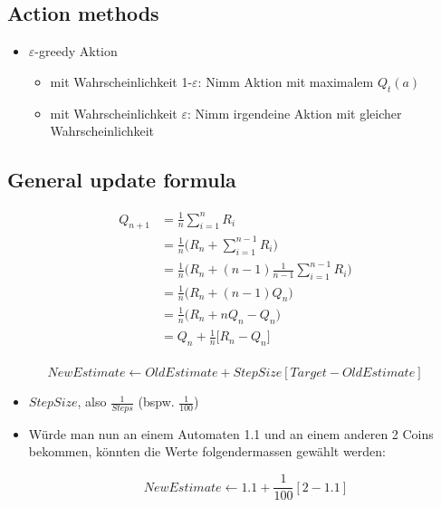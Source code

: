 \documentclass[a4paper]{article}
\begin{document}
		\subsection{Action methods}
		
		\begin{itemize}
			\item $\varepsilon$-greedy Aktion
				\begin{itemize}
					\item mit Wahrscheinlichkeit 1-$\varepsilon$: Nimm Aktion mit maximalem $Q_{t}(a)$
					\item mit Wahrscheinlichkeit $\varepsilon$: Nimm irgendeine Aktion mit gleicher Wahrscheinlichkeit
				\end{itemize}
		\end{itemize}
	
		\newpage
	
		\subsection{General update formula}
		
		\begin{equation}
		\begin{split}
Q_{n+1} & = \frac{1}{n} \sum_{i=1}^{n} R_i \\
			& = \frac{1}{n} \big( R_n + \sum_{i=1}^{n-1} R_i \big) \\
			& = \frac{1}{n} \big( R_n + (n-1) \frac{1}{n-1} \sum_{i=1}^{n-1} R_i \big) \\
			& = \frac{1}{n} \big( R_n + (n-1) Q_n \big) \\
			& = \frac{1}{n} \big( R_n + n Q_n - Q_n \big) \\
			& = Q_n + \frac{1}{n} \big[ R_n - Q_n \big] \\
		\end{split}
		\end{equation}
		
		$$ NewEstimate \leftarrow OldEstimate + StepSize [Target - OldEstimate] $$
		
		\begin{itemize}
			\item $StepSize$, also $\frac{1}{Steps}$ (bspw. $\frac{1}{100}$)\\
			
			\item Würde man nun an einem Automaten 1.1 und an einem anderen 2 Coins bekommen, könnten die Werte folgendermassen gewählt werden:
			
			$$ NewEstimate \leftarrow 1.1 + \frac{1}{100} [2 - 1.1]$$
		\end{itemize}
	
\end{document}
